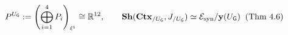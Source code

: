 \documentclass[preview]{standalone}
\begin{document}
\begin{align*}
\special{dvisvgm:raw <g id='unique000'>}P^{U_{\mathsf{G}}} := \left(\bigoplus_{i=1}^4 P_i\right)_{\ell^1} \cong \mathbb{R}^{12}, \qquad \mathbf{Sh}(\mathbf{Ctx}_{/U_{\mathsf{G}}}, J_{/U_{\mathsf{G}}}) \simeq \mathcal{E}_{\text{syn}}/\mathbf{y}(U_{\mathsf{G}})\;\;(\text{Thm 4.6})\special{dvisvgm:raw </g>}
\end{align*}
\end{document}
